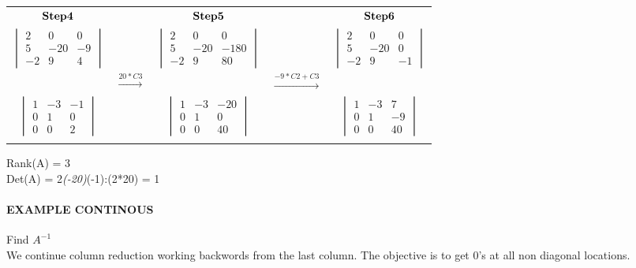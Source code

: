 \documentclass[]{article}
\let\oldparagraph\paragraph
\renewcommand{\paragraph}[1]{\oldparagraph{#1}\mbox{}}
\begin{document}
\begin{tabular}{ c c c c c }
 $\bold{Step 4}$ &  & $\bold{Step 5}$  &  & $\bold{Step 6}$ \\
$\begin{vmatrix} 2 & 0 & 0\\ 5 & -20 & -9 \\ -2 & 9 & 4 \end{vmatrix}$ &  & $\begin{vmatrix} 2 & 0 & 0\\ 5 & -20 & -180 \\ -2 & 9 & 80 \end{vmatrix}$ &  &
$\begin{vmatrix} 2 & 0 & 0\\ 5 & -20 & 0 \\ -2 & 9 & -1 \end{vmatrix}$\\
 & $\xrightarrow{20*C3}$ &  & $\xrightarrow{-9*C2 + C3}$ & \\ 
 $\begin{vmatrix} 1 &   -3 &   -1\\ 0 &   1 &   0 \\ 0 &   0 &   2 \end{vmatrix}$ &  &
$\begin{vmatrix} 1 &   -3 &   -20\\ 0 &   1 &   0 \\ 0 &   0 &   40 \end{vmatrix}$ & &
$\begin{vmatrix} 1 &   -3 &  7\\ 0 &   1 &   -9 \\ 0 &   0 &   40 \end{vmatrix}$\\
 &  &  \\
\end{tabular}

\endgroup

Rank(A) = 3\\
 Det(A) = 2\emph{(-20)}(-1):(2*20) = 1\\

\paragraph{\texorpdfstring{EXAMPLE CONTINOUS\\
}{EXAMPLE CONTINOUS }}\label{example-continous}

Find \(A^{-1}\)\\
 We continue column reduction working backwords from the last column.
The objective is to get 0's at all non diagonal locations.\\
\end{document}
